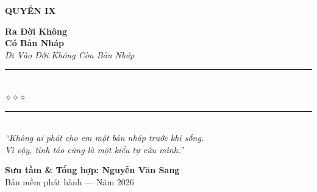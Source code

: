 \begin{titlepage}
\begin{center}
  \begin{tcolorbox}[
    width=6.5cm,
    colback=truyengold!20,
    colframe=truyengold!80!black,
    arc=4pt,
    boxrule=1.5pt,
    halign=center
  ]
    {\fontsize{18}{22}\selectfont\bfseries\color{truyenred!80!black}
     QUYỂN IX}
  \end{tcolorbox}
  \vspace{0.8cm}

  {\fontsize{38}{45}\selectfont\bfseries\color{truyenred!80!black}
    Ra Đời Không}\\[0.4cm]
  {\fontsize{38}{45}\selectfont\bfseries\color{truyengold!80!black}
    Có Bản Nháp}\\[0.4cm]

  {\fontsize{16}{20}\selectfont\color{truyengold!90!black}\itshape
    Đi Vào Đời Không Còn Bản Nháp}\\[1cm]

  {\color{truyenblue!60}\rule{6cm}{1pt}}\\[5pt]
  {\color{truyengold!80!black}\large$\diamond$\hspace{1cm}$\diamond$\hspace{1cm}$\diamond$}\\[5pt]
  {\color{truyenblue!60}\rule{6cm}{1pt}}\\[1.5cm]

  {\normalsize\itshape\color{truyenblue!90!black}
   ``Không ai phát cho em một bản nháp trước khi sống.\\
   Vì vậy, tỉnh táo cũng là một kiểu tự cứu mình.''}

  \vfill

  {\fontsize{16}{20}\selectfont\bfseries\color{truyenblue!90!black}
    Sưu tầm \& Tổng hợp: \textbf{Nguyễn Văn Sang}}\\[0.4cm]

  {\small\color{gray} Bản mềm phát hành --- Năm 2026}\\[0.5cm]
\end{center}

\afterpage{\nopagecolor}
\end{titlepage}